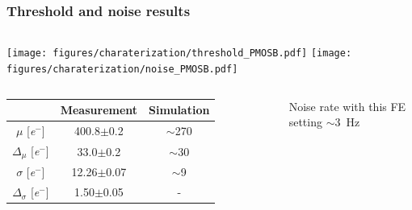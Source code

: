     \begin{frame}
        \frametitle{Threshold and noise results}
        \bigskip
        \begin{columns}
                \texttt{[image: figures/charaterization/threshold\_PMOSB.pdf]}
                \texttt{[image: figures/charaterization/noise\_PMOSB.pdf]} 
        \end{columns}                  
        \begin{columns}
                \begin{table}[h!]
                    \footnotesize
                    \begin{tabular}{| c |  c | c|}
                    \hline
                    & Measurement & Simulation \\
                    \hline
                    \hline
                    $\mu$ [\si{\elementarycharge}$^-$] & 400.8$\pm$0.2 & $\sim$270\\
                    $\Delta_{\mu}$ [\si{\elementarycharge}$^-$] & 33.0$\pm$0.2 & $\sim$30\\
                    $\sigma$ [\si{\elementarycharge}$^-$] & 12.26$\pm$0.07 & $\sim$9 \\
                    $\Delta_{\sigma}$ [\si{\elementarycharge}$^-$] & 1.50$\pm$0.05 & -\\
                    \hline
                    \end{tabular}
                \end{table}       

                Noise rate with this FE setting $\sim$\SI{3}{Hz} 
        \end{columns}

        \end{frame}



